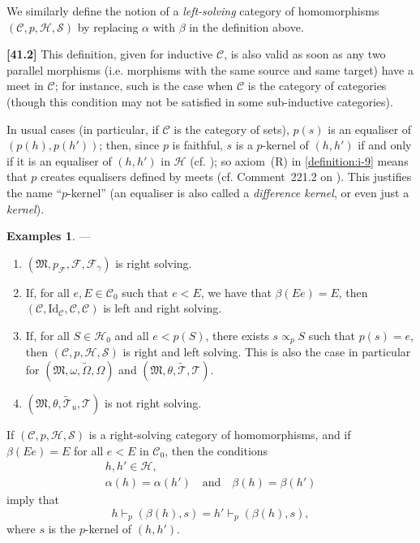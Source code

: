 \documentclass[a4paper,fleqn]{article}
\theoremstyle{plain}
\newenvironment{proposition}[1]
  {\renewcommand\theinnerproposition{#1}\innerproposition}
  {\endinnerproposition}
\theoremstyle{definition}
\newtheorem*{examples}{Examples}
\newenvironment{longcomm}[1]
  {\noindent\textbf{[#1]}\rmfamily}
  {}
\newcommand{\oldpage}[1]{{\marginpar{\footnotesize$\bigg\vert$\,\,\,\,\textit{p.~#1}}}}
\newcommand{\textand}{\quad\text{and}\quad}
\newcommand{\CC}{\mathcal{C}}
\newcommand{\HH}{\mathcal{H}}
\renewcommand{\SS}{\mathcal{S}}
\newcommand{\MM}{\mathfrak{M}}
\newcommand{\FF}{\mathcal{F}}
\newcommand{\TT}{\mathcal{T}}
\newcommand{\tTT}{\widetilde{\TT}}
\newcommand{\subs}{\mathrel{\propto}}
\newcommand{\Id}{\mathrm{Id}}
\begin{document}
We similarly define the notion of a \emph{left-solving} category of homomorphisms $(\CC,p,\HH,\SS)$ by replacing $\alpha$ with $\beta$ in the definition above.

\begin{longcomm}{41.2}
  This definition, given for inductive $\CC$, is also valid as soon as any two parallel morphisms (i.e. morphisms with the same source and same target) have a meet in $\CC$;
  for instance, such is the case when $\CC$ is the category of categories (though this condition may not be satisfied in some sub-inductive categories).

  In usual cases (in particular, if $\CC$ is the category of sets), $p(s)$ is an equaliser of $(p(h),p(h'))$;
  then, since $p$ is faithful, $s$ is a $p$-kernel of $(h,h')$ if and only if it is an equaliser of $(h,h')$ in $\HH$ (cf. \cite[Proposition~3.1]{coll109});
  so axiom~(R) in \cref{definition:i-9} means that $p$ creates equalisers defined by meets (cf. Comment~221.2 on \cite{coll100}).
  This justifies the name ``$p$-kernel'' (an equaliser is also called a \emph{difference kernel}, or even just a \emph{kernel}).
\end{longcomm}

\begin{examples}
  ---
  \begin{enumerate}
    \item[\normalfont(1)]
      $(\MM,p_\FF,\FF,\FF_\gamma)$ is right solving.

    \item[\normalfont(2)]
      If, for all $e,E\in\CC_0$ such that $e<E$, we have that $\beta(Ee)=E$, then $(\CC,\Id_\CC,\CC,\CC)$ is left and right solving.

    \item[\normalfont(3)]
      If, for all $S\in\HH_0$ and all $e<p(S)$, there exists $s\subs_p S$ such that $p(s)=e$, then $(\CC,p,\HH,\SS)$ is right and left solving.
      This is also the case in particular for $(\MM,\omega,\widetilde{\Omega},\Omega)$ and $(\MM,\theta,\tTT,\TT)$.

    \item[\normalfont(4)]
      \oldpage{370}
      $(\MM,\theta,\tTT_u,\TT)$ is not right solving.
  \end{enumerate}
\end{examples}

\begin{proposition}{11}
\label{proposition:i-11}
  If $(\CC,p,\HH,\SS)$ is a right-solving category of homomorphisms, and if $\beta(Ee)=E$ for all $e<E$ in $\CC_0$, then the conditions
  \[
    \begin{gathered}
      h,h'\in\HH,
    \\\alpha(h)=\alpha(h')
      \textand
      \beta(h)=\beta(h')
    \end{gathered}
  \]
  imply that
  \[
    h\vdash_p(\beta(h),s)
    = h'\vdash_p(\beta(h),s),
  \]
  where $s$ is the $p$-kernel of $(h,h')$.
\end{proposition}
\end{document}
